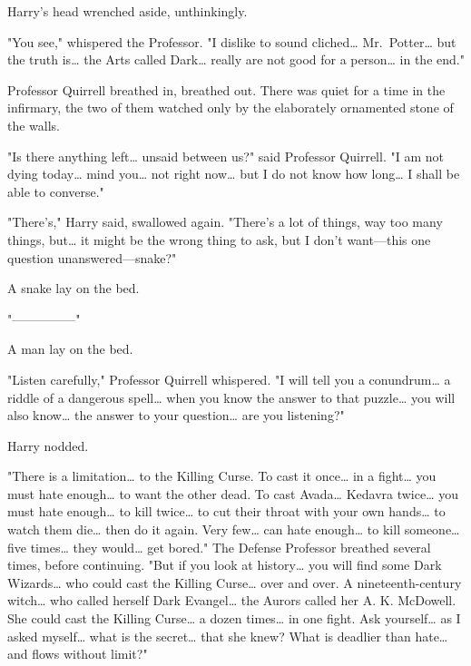 Harry's head wrenched aside, unthinkingly.

"You see," whispered the Professor. "I dislike to sound cliched{\ldots} 
Mr.~Potter{\ldots} but the truth is{\ldots} the Arts called Dark{\ldots} really 
are not good for a person{\ldots} in the end."

Professor Quirrell breathed in, breathed out. There was quiet for a time in the 
infirmary, the two of them watched only by the elaborately ornamented stone of 
the walls.

"Is there anything left{\ldots} unsaid between us?" said Professor Quirrell. "I 
am not dying today{\ldots} mind you{\ldots} not right now{\ldots} but I do not 
know how long{\ldots} I shall be able to converse."

"There's," Harry said, swallowed again. "There's a lot of things, way too many 
things, but{\ldots} it might be the wrong thing to ask, but I don't want---this 
one question unanswered---snake?"

A snake lay on the bed.

"---------------"

A man lay on the bed.

"Listen carefully," Professor Quirrell whispered. "I will tell you a 
conundrum{\ldots} a riddle of a dangerous spell{\ldots} when you know the 
answer to that puzzle{\ldots} you will also know{\ldots} the answer to your 
question{\ldots} are you listening?"

Harry nodded.

"There is a limitation{\ldots} to the Killing Curse. To cast it once{\ldots} in 
a fight{\ldots} you must hate enough{\ldots} to want the other dead. To cast 
Avada{\ldots} Kedavra twice{\ldots} you must hate enough{\ldots} to kill 
twice{\ldots} to cut their throat with your own hands{\ldots} to watch them 
die{\ldots} then do it again. Very few{\ldots} can hate enough{\ldots} to kill 
someone{\ldots} five times{\ldots} they would{\ldots} get bored." The Defense 
Professor breathed several times, before continuing. "But if you look at 
history{\ldots} you will find some Dark Wizards{\ldots} who could cast the 
Killing Curse{\ldots} over and over. A nineteenth-century witch{\ldots} who 
called herself Dark Evangel{\ldots} the Aurors called her A. K. McDowell. She 
could cast the Killing Curse{\ldots} a dozen times{\ldots} in one fight. Ask 
yourself{\ldots} as I asked myself{\ldots} what is the secret{\ldots} that she 
knew? What is deadlier than hate{\ldots} and flows without limit?"

